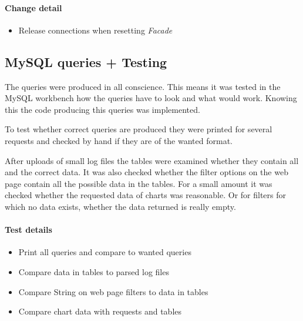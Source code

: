 \paragraph{Change detail} 
\begin{itemize}
  \item Release connections when resetting \textit{Facade}
\end{itemize}


\subsection{MySQL queries + Testing}
The queries were produced in all conscience. This means it was tested in the 
MySQL workbench how the queries have to look and what would work. Knowing this
the code producing this queries was implemented.

To test whether correct queries are produced they were printed for several requests
and checked by hand if they are of the wanted format.

After uploads of small log files the tables were examined whether they contain all
and the correct data. It was also checked whether the filter options on the web page
contain all the possible data in the tables. For a small amount it was checked
whether the requested data of charts was reasonable. Or for filters for which no 
data exists, whether the data returned is really empty.


\paragraph{Test details}
\begin{itemize}
  \item Print all queries and compare to wanted queries
  \item Compare data in tables to parsed log files
  \item Compare String on web page filters to data in tables 
  \item Compare chart data with requests and tables
\end{itemize}





